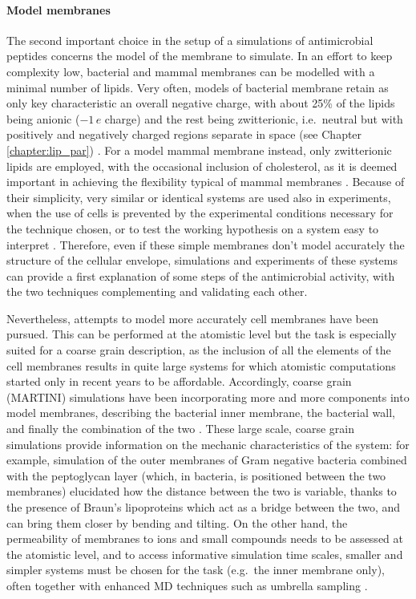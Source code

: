 \paragraph{Model membranes} The second important choice in the setup of a simulations of antimicrobial peptides concerns the model of the membrane to simulate. In an effort to keep complexity low, bacterial and mammal membranes can be modelled with a minimal number of lipids.
%
Very often, models of bacterial membrane retain as only key characteristic an overall negative charge, with about 25\% of the lipids being anionic ($-1\,e$ charge) and the rest being zwitterionic, i.e.\ neutral but with positively and negatively charged regions separate in space (see Chapter \ref{chapter:lip_par}) \cite{Lipkin2017,Wang2012,Zhao2018,Chen2019}.
For a model mammal membrane instead, only zwitterionic lipids are employed, with the occasional inclusion of cholesterol, as it is deemed important in achieving the flexibility typical of mammal membranes \cite{Lipkin2017,Wang2012,Zhao2018,Chen2019,Risselada2008}.
Because of their simplicity, very similar or identical systems are used also in experiments, when the use of cells is prevented by the experimental conditions necessary for the technique chosen, or to test the working hypothesis on a system easy to interpret \cite{Castelletto2016,Tang2009,Glukhov2005}.
Therefore, even if these simple membranes don't model accurately the structure of the cellular envelope, simulations and experiments of these systems can provide a first explanation of some steps of the antimicrobial activity, with the two techniques complementing and validating each other.

Nevertheless, attempts to model more accurately cell membranes have been pursued. This can be performed at the atomistic level \cite{Piggot2011}
but the task is especially suited for a coarse grain description, as the inclusion of all the elements of the cell membranes results in quite large systems for which atomistic computations started only in recent years to be affordable.
%
Accordingly, coarse grain (MARTINI) simulations have been incorporating more and more components into model membranes, describing the bacterial inner membrane, the bacterial wall, and finally the combination of the two \cite{Khalid2019}.
%
These large scale, coarse grain simulations provide information on the mechanic characteristics of the system: for example, simulation of the outer membranes of Gram negative bacteria combined with the peptoglycan layer (which, in bacteria, is positioned between the two membranes) elucidated how the distance between the two is variable, thanks to the presence of Braun's lipoproteins which act as a bridge between the two, and can bring them closer by bending and tilting.
%
On the other hand, the permeability of membranes to ions and small compounds needs to be assessed at the atomistic level, and to access informative simulation time scales, smaller and simpler systems must be chosen for the task (e.g.\ the inner membrane only), often together with enhanced MD techniques such as umbrella sampling \cite{Piggot2011,Carpenter2016}.


